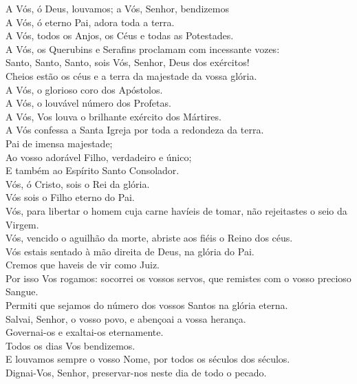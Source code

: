 \begin{flushleft}
    A Vós, ó Deus, louvamos; a Vós, Senhor, bendizemos \\
    A Vós, ó eterno Pai, adora toda a terra. \\
    A Vós, todos os Anjos, os Céus e todas as Potestades. \\
    A Vós, os Querubins e Serafins proclamam com incessante vozes: \\
    Santo, Santo, Santo, sois Vós, Senhor, Deus dos exércitos! \\
    Cheios estão os céus e a terra da majestade da vossa glória. \\
    A Vós, o glorioso coro dos Apóstolos. \\
    A Vós, o louvável número dos Profetas. \\
    A Vós, Vos louva o brilhante exército dos Mártires. \\
    A Vós confessa a Santa Igreja por toda a redondeza da terra. \\
    Pai de imensa majestade; \\
    Ao vosso adorável Filho, verdadeiro e único; \\
    E também ao Espírito Santo Consolador. \\
    Vós, ó Cristo, sois o Rei da glória. \\
    Vós sois o Filho eterno do Pai. \\
    Vós, para libertar o homem cuja carne havíeis de tomar, não rejeitastes o seio da Virgem. \\
    Vós, vencido o aguilhão da morte, abriste aos fiéis o Reino dos céus. \\
    Vós estais sentado à mão direita de Deus, na glória do Pai. \\
    Cremos que haveis de vir como Juiz. \\
    Por isso Vos rogamos: socorrei os vossos servos, que remistes com o vosso precioso Sangue. \\
    Permiti que sejamos do número dos vossos Santos na glória eterna. \\
    Salvai, Senhor, o vosso povo, e abençoai a vossa herança. \\
    Governai-os e exaltai-os eternamente. \\
    Todos os dias Vos bendizemos. \\
    E louvamos sempre o vosso Nome, por todos os séculos dos séculos. \\
    Dignai-Vos, Senhor, preservar-nos neste dia de todo o pecado. \\

\end{flushleft}
